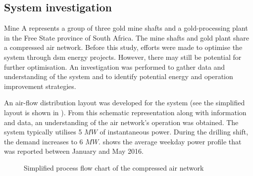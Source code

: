 \subsection{System investigation}
Mine A represents a group of three gold mine shafts and a gold-processing plant in the Free State province of South Africa. The mine shafts and gold plant share a compressed air network. Before this study, efforts were made to optimise the system through \gls{dsm} energy projects. However, there may still be potential for further optimisation. An investigation was performed to gather data and understanding of the system and to identify potential energy and operation improvement strategies.
\par 
An air-flow distribution layout was developed for the system (see the simplified layout is shown in ). From this schematic representation along with information and data, an understanding of the air network’s operation was obtained. The system typically utilises 5 $MW$ of instantaneous power. During the drilling shift, the demand increases to 6 $MW$.  shows the average weekday power profile that was reported between January and May 2016.\par 
\begin{figure}[h!]
	\centering
	\caption{Simplified process flow chart of the compressed air network}
	\label{fig: Beatrix Air layout}
\end{figure}
